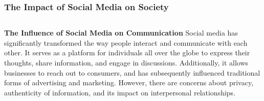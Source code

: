 \documentclass[5pt]{beamer}
\begin{document}
\begin{frame}
\frametitle{The Impact of Social Media on Society}
\begin{columns}
\begin{column}{0.7\textwidth}
\begin{block}{\textbf{The Influence of Social Media on Communication}}
Social media has significantly transformed the way people interact and communicate with each other. It serves as a platform for individuals all over the globe to express their thoughts, share information, and engage in discussions. Additionally, it allows businesses to reach out to consumers, and has subsequently influenced traditional forms of advertising and marketing. However, there are concerns about privacy, authenticity of information, and its impact on interpersonal relationships.
\end{block}
\end{column}
\end{columns}
\end{frame}
\end{document}

